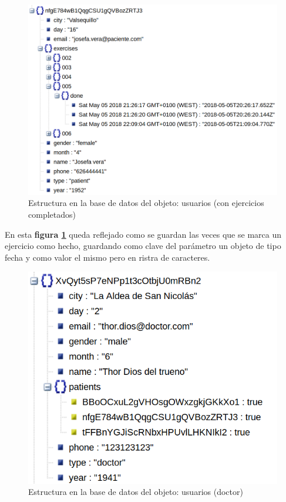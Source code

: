 \medskip
\begin{figure}
    \includegraphics[width=\linewidth]{./images/users-patient-with-exercises-done-database.png}
    \caption{Estructura en la base de datos del objeto: usuarios (con ejercicios completados)}
    \label{usuario-con-ejercicios}
\end{figure}

En esta \textbf{figura \ref{usuario-con-ejercicios}} queda reflejado como
se guardan las veces que se marca un ejercicio como hecho, guardando como clave
del parámetro un objeto de tipo fecha y como valor el mismo pero en ristra de
caracteres.

\medskip
\begin{figure}
    \includegraphics[width=\linewidth]{./images/users-doctor-database.png}
    \caption{Estructura en la base de datos del objeto: usuarios (doctor)}
    \label{usuario-doctor}
\end{figure}

